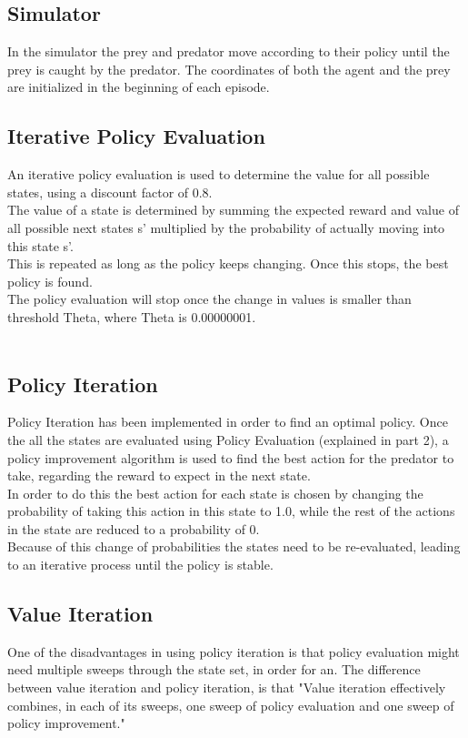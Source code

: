 \documentclass[11pt]{article}
\begin{document}
\subsection{Simulator}
In the simulator the prey and predator move according to their policy until the prey is caught by the predator. The coordinates of both the agent and the prey are initialized in the beginning of each episode.


\subsection{Iterative Policy Evaluation}
An iterative policy evaluation is used to determine the value for all possible states, using a discount factor of 0.8.\\
The value of a state is determined by summing the expected reward and value of all possible next states s' multiplied by the probability of actually moving into this state s'.\\
This is repeated as long as the policy keeps changing. Once this stops, the best policy is found.\\
The policy evaluation will stop once the change in values is smaller than threshold Theta, where Theta is 0.00000001.\cite{1}\\\\


\subsection{Policy Iteration}
Policy Iteration has been implemented in order to find an optimal policy.
Once the all the states are evaluated using  Policy Evaluation (explained in part 2), a policy improvement algorithm is used to find the best action for the predator to take, regarding the reward to expect in the next state.\\
In order to do this the best action for each state is chosen by changing the probability of taking this action in this state to 1.0, while the rest of the actions in the state are reduced to a probability of 0. \\
Because of this change of probabilities the states need to be re-evaluated, leading to an iterative process until the policy is stable. \cite{2}


\subsection{Value Iteration}
One of the disadvantages in using policy iteration is that policy evaluation might need multiple sweeps through the state set, in order for an. The difference between value iteration and policy iteration, is that "Value iteration effectively combines, in each of its sweeps, one sweep of policy evaluation and one sweep of policy improvement." \cite{3}\\
\end{document}
